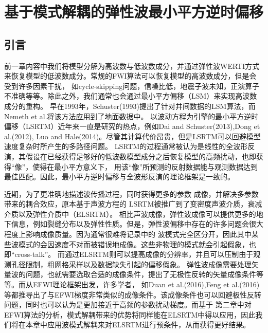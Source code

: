 \chapter{基于模式解耦的弹性波最小平方逆时偏移}
\label{cha:MD-ELSRTM}
\section{引言}
前一章内容中我们将模型分解为高波数与低波数成分，并通过弹性波WERTI方式来恢复模型的低波数成分。常规的FWI算法可以恢复模型的高波数成分，但是会受到许多因素干扰，
如cycle-skipping问题，信噪比低，地震子波未知，正演算子不准确等等。除此之外，我们通常也会通过最小平方偏移（LSM）来实现高波数成分的重构。
早在1993年，Schuster(1993)\cite{Schuster1993}提出了针对井间数据的LSM算法，而Nemeth et al.\cite{Nemeth1999}将该方法应用到了地面数据中。
以波动方程为引擎的最小平方逆时偏移（LSRTM）近年来一直是研究的热点，例如Dai and
Schuster(2013)\cite{Dai2013},Dong et al.(2012)\cite{Dong2012}, Luo and
Hale(2014)\cite{Luo2014}。尽管其计算代价昂贵，但是LSRTM可以回避模型速度复杂时所产生的多路径问题。
LSRTM的过程通常被认为是线性的全波形反演，其假设在已经获得足够好的低波数模型成分之后恢复模型的高频扰动，也即获得“像”，使得在最小平方意义下，
用该“像”所预测的反射数据能与观测数据达到最佳匹配。因此，最小平方逆时偏移与全波形反演的理论框架是一致的。

近期，为了更准确地描述波传播过程，同时获得更多的参数
成像，并解决多参数带来的耦合效应，原本基于声波方程的
LSRTM被推广到了变密度声波介质\cite{Yang2017}，衰减介质\cite{Dai2015}以及弹性介质中\cite{Duan2016,Feng2016,Xu2016}（ELSRTM）。
相比声波成像，弹性波成像可以提供更多的地下信息，例如裂缝分布以及弹性性质。但是，弹性波偏移中存在的许多问题会很大程度上影响成像质量。因为通常很难将记录中的
波模式完全区分开，因此其中某些波模式的会因速度不对而被错误地成像。这些非物理的模式就会引起假象，也即“cross-talk”。
而通过ELSRTM则可以提高成像的分辨率，并且可以压制由于观测孔径限制，粗网格采样以及数据缺失引起的偏移假象。
弹性波成像需要处理矢量波的问题，也就需要选取合适的成像条件，{\color{red}\cite{Wang2016}提出了无极性反转的矢量成像条件等等。}而从EFWI理论框架出发，许多学者，
如Duan et al.(2016)\cite{Duan2016},Feng et
al.(2016)\cite{Feng2016}等都推导出了与EFWI梯度非常类似的成像条件。该成像条件也可以回避极性反转问题，同时也可以认为是更加接近于高频的参数扰动梯度。而基于
第二章中对EFWI算法的分析，模式解耦带来的优势将同样能在ELSRTM中得以应用，因此我们将在本章中应用波模式解耦来对ELSRTM进行预条件，从而获得更好结果。
